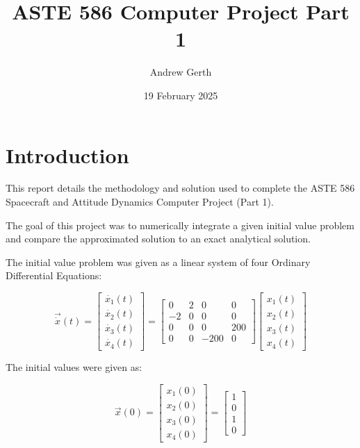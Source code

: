 \documentclass[11pt, oneside]{article}   	%
\title{ASTE 586 Computer Project Part 1}
\author{Andrew Gerth}
\date{19 February 2025}							%
\begin{document}
\maketitle
\section{Introduction}
This report details the methodology and solution used to complete the ASTE 586 Spacecraft and Attitude Dynamics Computer Project (Part 1). 

The goal of this project was to numerically integrate a given initial value problem and compare the approximated solution to an exact analytical solution.

The initial value problem was given as a linear system of four Ordinary Differential Equations:


\[
\vec{\dot{x}}(t) = 
\left[
\begin{array}{ccc}
\dot{x_1}(t)\\
\dot{x_2}(t)\\
\dot{x_3}(t)\\
\dot{x_4}(t)
\end{array}
\right]
=
\left[
\begin{array}{cccc}
0 & 2 & 0 & 0 \\
-2 & 0 & 0 & 0 \\
0 & 0 & 0 & 200 \\
0 & 0 & -200 & 0
\end{array}
\right]
\left[
\begin{array}{ccc}
x_1(t)\\
x_2(t)\\
x_3(t)\\
x_4(t)
\end{array}
\right]
\]


The initial values were given as:

\[
\vec{x}(0) = 
\left[
\begin{array}{ccc}
x_1(0) \\
x_2(0) \\
x_3(0) \\
x_4(0)
\end{array}
\right]
=
\left[
\begin{array}{ccc}
1 \\
0 \\
1 \\
0
\end{array}
\right]
\]
\end{document}
